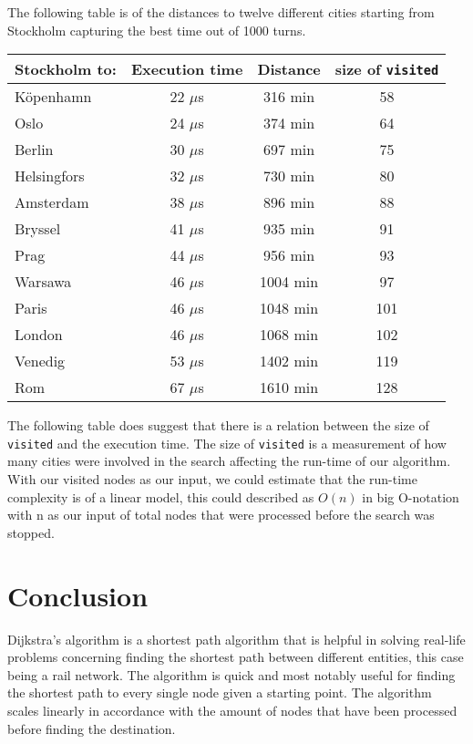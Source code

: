 \documentclass[a4paper,11pt]{article}
\begin{document}
        The following table is of the distances to twelve different cities starting from Stockholm capturing the best time out of 1000 turns.
        \begin{table}[h]
        \begin{center}
        \begin{tabular}{l|c|c|c}
        \textbf{Stockholm to:} & \textbf{Execution time} & \textbf{Distance} & \textbf{size of \texttt{visited}}\\
        \hline
        Köpenhamn   & 22 $\mu$s & 316 min  & 58 \\
        Oslo        & 24 $\mu$s & 374 min  & 64 \\
        Berlin      & 30 $\mu$s & 697 min  & 75 \\
        Helsingfors & 32 $\mu$s & 730 min  & 80 \\
        Amsterdam   & 38 $\mu$s & 896 min  & 88 \\
        Bryssel     & 41 $\mu$s & 935 min  & 91 \\
        Prag        & 44 $\mu$s & 956 min  & 93 \\
        Warsawa     & 46 $\mu$s & 1004 min & 97 \\
        Paris       & 46 $\mu$s & 1048 min & 101\\
        London      & 46 $\mu$s & 1068 min & 102\\
        Venedig     & 53 $\mu$s & 1402 min & 119\\
        Rom         & 67 $\mu$s & 1610 min & 128\\
        \end{tabular}
        \end{center}
        \end{table}

        The following table does suggest that there is a relation between the size of \texttt{visited} and the execution time. The size of \texttt{visited} is a measurement of how many cities were involved in the search affecting the run-time of our algorithm. With our visited nodes as our input, we could estimate that the run-time complexity is of a linear model, this could described as $O(n)$ in big O-notation with n as our input of total nodes that were processed before the search was stopped.
        
\section*{Conclusion}

    Dijkstra's algorithm is a shortest path algorithm that is helpful in solving real-life problems concerning finding the shortest path between different entities, this case being a rail network. The algorithm is quick and most notably useful for finding the shortest path to every single node given a starting point. The algorithm scales linearly in accordance with the amount of nodes that have been processed before finding the destination.
    
\end{document}
